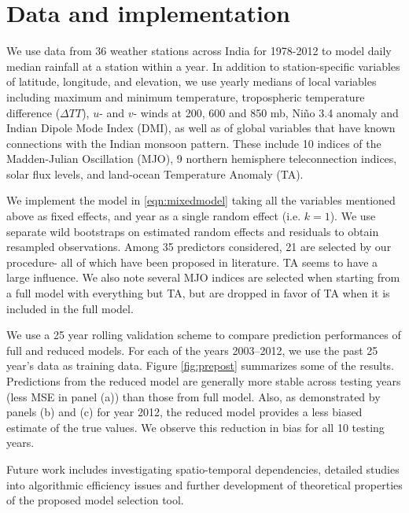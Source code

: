 \documentclass[11pt,twocolumn,twoside]{IEEEtran}
\begin{document}
\section{Data and implementation}

We use data from 36 weather stations across India for 1978-2012 to model daily median rainfall at a station within a year. In addition to station-specific variables of latitude, longitude, and elevation, we use yearly medians of local variables including maximum and minimum temperature, tropospheric temperature difference ($\Delta TT$), $u$- and $v$- winds at 200, 600 and 850 mb, Ni\~{n}o 3.4 anomaly and Indian Dipole Mode Index (DMI), as well as of global variables that have known connections with the Indian monsoon pattern.  These include 10 indices of the Madden-Julian Oscillation (MJO), 9 northern hemisphere teleconnection indices, solar flux levels, and land-ocean Temperature Anomaly (TA).

We implement the model in \ref{eqn:mixedmodel} taking all the variables mentioned above as fixed effects, and year as a single random effect (i.e. $k=1$). We use separate wild bootstraps\cite{Mammen93} on estimated random effects and residuals to obtain resampled observations. Among 35 predictors considered, 21 are selected by our procedure- all of which have been proposed in literature. TA seems to have a large influence.  We also note several MJO indices are selected when starting from a full model with everything but TA, but are dropped in favor of TA when it is included in the full model.

We use a 25 year rolling validation scheme to compare prediction performances of full and reduced models. For each of the years 2003--2012, we use the past 25 year's data as training data. Figure \ref{fig:prepost} summarizes some of the results. Predictions from the reduced model are generally more stable across testing years (less MSE in panel (a)) than those from full model. Also, as demonstrated by panels (b) and (c) for year 2012, the reduced model provides a less biased estimate of the true values.  We observe this reduction in bias for all 10 testing years.

Future work includes investigating spatio-temporal dependencies, detailed studies into algorithmic efficiency issues and further development of theoretical properties of the proposed model selection tool.




\end{document}
